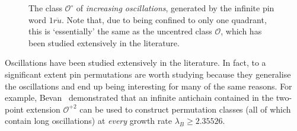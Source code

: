 \documentclass[11pt,a4paper]{article}
\newcommand{\plotptradius}{4pt}
\theoremstyle{definition}
\newcommand{\fitellipsis}[2] %
{\draw let \p1=(#1), \p2=(#2), \n1={atan2(\y2-\y1,\x2-\x1)}, \n2={veclen(\y2-\y1,\x2-\x1)}
    in ($ (\p1)!0.5!(\p2) $) ellipse [x radius=\n2/2+0.5cm, y radius=0.5cm, rotate=\n1];
}
\begin{document}
\begin{figure}[h]
\begin{center}
\end{center}
\caption{The class $\mathcal{O}^{\circ}$ of \emph{increasing oscillations}, generated by the infinite pin word $1\overline{ru}$. Note that, due to being confined to only one quadrant, this is `essentially' the same as the uncentred class $\mathcal{O}$, which has been studied extensively in the literature.}
\label{fig:oscclass}
\end{figure}

Oscillations have been studied extensively in the literature. In fact, to a significant extent pin permutations are worth studying because they generalise the oscillations and end up being interesting for many of the same reasons. For example, Bevan~\cite{bevan:intervals} demonstrated that an infinite antichain contained in the two-point extension $\mathcal{O}^{+2}$ can be used to construct permutation classes (all of which contain long oscillations) at \emph{every} growth rate $\lambda_{B} \geq 2.35526$.
\end{document}
